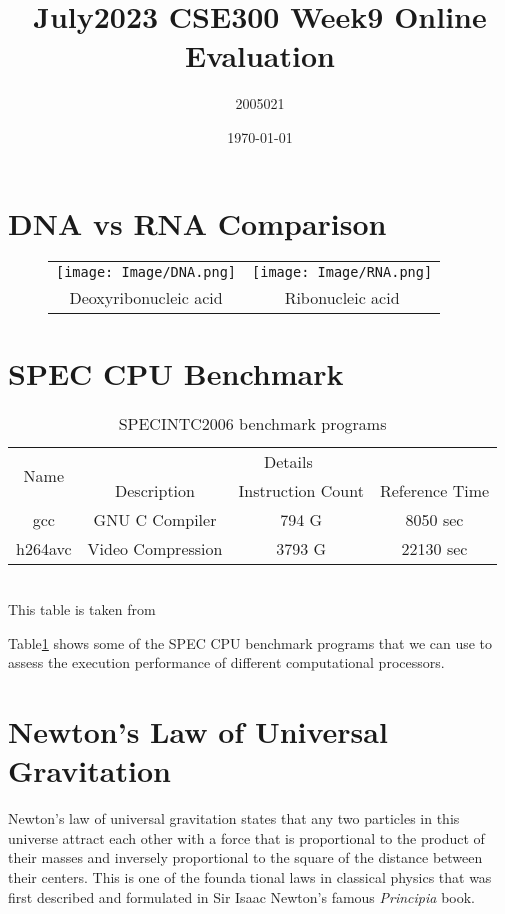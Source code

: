 \documentclass[11pt]{article}
\title{July2023 CSE300 Week9 Online Evaluation}
\author{2005021}
\date{\today}
\begin{document}
    \maketitle
    \section*{DNA vs RNA Comparison}
    \begin{figure}[h]
        \centering
        \begin{tabular}{cc}
            \texttt{[image: Image/DNA.png]} & \texttt{[image: Image/RNA.png]} \\
            Deoxyribonucleic acid & Ribonucleic acid \\
        \end{tabular}
    \end{figure}

    \section*{SPEC CPU Benchmark}
    \begin{table}[h]
        \centering
        \caption{ SPECINTC2006 benchmark programs}
        \begin{tabular}{|c|c|c|c|}
            \hline
            \multirow{2}{*}{Name} & \multicolumn{3}{c|}{Details} \\
            \cline{2-4}
            & Description & Instruction Count & Reference Time \\
            \hline
            gcc & GNU C Compiler & 794 G & 8050 sec\\
            \hline
            h264avc & Video Compression & 3793 G & 22130 sec \\
            \hline
        \end{tabular}\\
        \label{tab:my_label}
        This table is taken from \cite{chaudhuri2008computer}\\
    \end{table}
    
    Table\ref{tab:my_label}
    shows some of the SPEC CPU benchmark programs that we can use to assess
the execution performance of different computational processors.

\pagebreak

\section*{Newton’s Law of Universal Gravitation}
Newton’s law of universal gravitation states that any two particles in this universe attract
each other with a force that is proportional to the product of their masses and inversely
proportional to the square of the distance between their centers. This is one of the foundational laws in classical physics that was first described and formulated in Sir Isaac Newton’s
famous \textit{Principia} book\cite{newton1934principia}.\\
\end{document}
